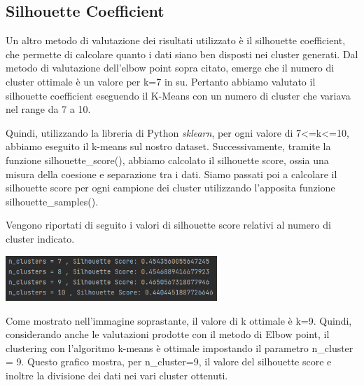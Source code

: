 \documentclass[a4paper, 10pt]{report}
\begin{document}
            \subsection{Silhouette Coefficient}
                Un altro metodo di valutazione dei risultati utilizzato è il silhouette coefficient, che permette di calcolare
                quanto i dati siano ben disposti nei cluster generati.
                Dal metodo di valutazione dell'elbow point sopra citato, emerge che il numero di cluster ottimale è un valore
                per k=7 in su.
                Pertanto abbiamo valutato il silhouette coefficient eseguendo il K-Means con un numero di cluster che variava
                nel range da 7 a 10.

                Quindi, utilizzando la libreria di Python \textit{sklearn}, per ogni valore di 7<=k<=10, abbiamo eseguito il k-means sul
                nostro dataset. Successivamente, tramite la funzione silhouette\_{}score(), abbiamo calcolato il silhouette score,
                ossia una misura della coesione e separazione tra i dati.
                Siamo passati poi a calcolare il silhouette score per ogni campione dei cluster utilizzando l'apposita funzione
                silhouette\_{}samples().

                Vengono riportati di seguito i valori di silhouette score relativi al numero di cluster indicato.

                \begin{center}
                    \includegraphics[width=8cm]{evaluation/silhouette score}\\
                \end{center}

                Come mostrato nell'immagine soprastante, il valore di k ottimale è k=9. Quindi, considerando anche le valutazioni
                prodotte con il metodo di Elbow point, il clustering con l'algoritmo k-means è ottimale impostando il parametro
                n\_{}cluster = 9. Questo grafico mostra, per n\_{}cluster=9, il valore del silhouette score e inoltre la divisione
                dei dati nei vari cluster ottenuti.
\end{document}
